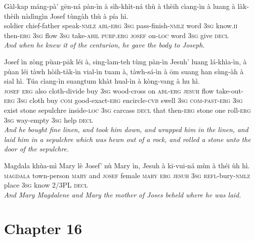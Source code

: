 \documentclass[11pt,a4paper]{article}
\begin{document}
\begin{exe}
\gll Gàl-kap máng-pà' gēn-ná pàn-ìn à sìh-khìt-ná thù à thèih cìang-ìn à luang à làk-thèih nàdìngìn Josef tùngàh thù à pía hì. \\
     soldier chief-father speak-\textsc{nmlz} \textsc{abl}-\textsc{erg} \textsc{3sg} pass-finish-\textsc{nmlz} word \textsc{3sg} know.\textsc{ii} then-\textsc{erg} \textsc{3sg} flow \textsc{3sg} take-\textsc{abil} \textsc{purp}.\textsc{erg} \textsc{josef} on-\textsc{loc} word \textsc{3sg} give \textsc{decl} \\
\glt \textcolor{kjvcolor}{\textit{And when he knew it of the centurion, he gave the body to Joseph.}}

\gll Josef ìn zòng pùan-pāk léi à, sing-lam-teh tùng pàn-ìn Jesuh' luang lá-khìa-ìn, à pùan léi tàwh hòih-tàk-ìn vial-ìn tuam à, tàwh-sá-ìn à ōm suang han sùng-àh à sial hì. Túa cìang-ìn suangtum khàt hual-ìn à kòng-vang à hu hì. \\
     \textsc{josef} \textsc{erg} also cloth-divide buy \textsc{3sg} wood-cross on \textsc{abl}-\textsc{erg} \textsc{jesuh} flow take-out-\textsc{erg} \textsc{3sg} cloth buy \textsc{com} good-exact-\textsc{erg} encircle-\textsc{cvb} swell \textsc{3sg} \textsc{com}-\textsc{past}-\textsc{erg} \textsc{3sg} exist stone sepulchre inside-\textsc{loc} \textsc{3sg} carcass \textsc{decl} that then-\textsc{erg} stone one roll-\textsc{erg} \textsc{3sg} way-empty \textsc{3sg} help \textsc{decl} \\
\glt \textcolor{kjvcolor}{\textit{And he bought fine linen, and took him down, and wrapped him in the linen, and laid him in a sepulchre which was hewn out of a rock, and rolled a stone unto the door of the sepulchre.}}

\gll Magdala khùa-mì Mary lè Josef' nù Mary ìn, Jesuh à kī-vui-ná mùn à théi ùh hì. \\
     \textsc{magdala} town-person \textsc{mary} and \textsc{josef} female \textsc{mary} \textsc{erg} \textsc{jesuh} \textsc{3sg} \textsc{refl}-bury-\textsc{nmlz} place \textsc{3sg} know 2/3PL \textsc{decl} \\
\glt \textcolor{kjvcolor}{\textit{And Mary Magdalene and Mary the mother of Joses beheld where he was laid.}}

\end{exe}
\newpage

\section*{Chapter 16}
\end{document}
